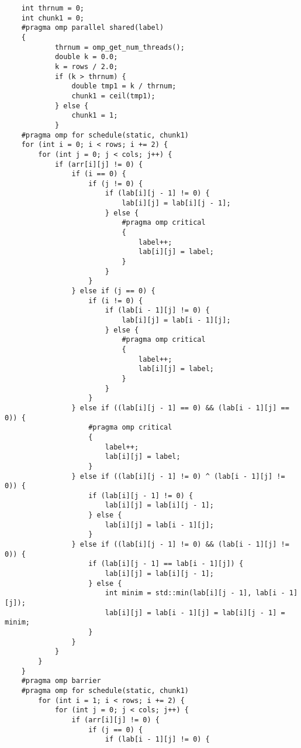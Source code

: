 \documentclass{report}
\begin{document}
\begin{lstlisting}
    int thrnum = 0;
    int chunk1 = 0;
    #pragma omp parallel shared(label)
    {
            thrnum = omp_get_num_threads();
            double k = 0.0;
            k = rows / 2.0;
            if (k > thrnum) {
                double tmp1 = k / thrnum;
                chunk1 = ceil(tmp1);
            } else {
                chunk1 = 1;
            }
    #pragma omp for schedule(static, chunk1)
    for (int i = 0; i < rows; i += 2) {
        for (int j = 0; j < cols; j++) {
            if (arr[i][j] != 0) {
                if (i == 0) {
                    if (j != 0) {
                        if (lab[i][j - 1] != 0) {
                            lab[i][j] = lab[i][j - 1];
                        } else {
                            #pragma omp critical
                            {
                                label++;
                                lab[i][j] = label;
                            }
                        }
                    }
                } else if (j == 0) {
                    if (i != 0) {
                        if (lab[i - 1][j] != 0) {
                            lab[i][j] = lab[i - 1][j];
                        } else {
                            #pragma omp critical
                            {
                                label++;
                                lab[i][j] = label;
                            }
                        }
                    }
                } else if ((lab[i][j - 1] == 0) && (lab[i - 1][j] == 0)) {
                    #pragma omp critical
                    {
                        label++;
                        lab[i][j] = label;
                    }
                } else if ((lab[i][j - 1] != 0) ^ (lab[i - 1][j] != 0)) {
                    if (lab[i][j - 1] != 0) {
                        lab[i][j] = lab[i][j - 1];
                    } else {
                        lab[i][j] = lab[i - 1][j];
                    }
                } else if ((lab[i][j - 1] != 0) && (lab[i - 1][j] != 0)) {
                    if (lab[i][j - 1] == lab[i - 1][j]) {
                        lab[i][j] = lab[i][j - 1];
                    } else {
                        int minim = std::min(lab[i][j - 1], lab[i - 1][j]);
                        lab[i][j] = lab[i - 1][j] = lab[i][j - 1] = minim;
                    }
                }
            }
        }
    }
    #pragma omp barrier
    #pragma omp for schedule(static, chunk1)
        for (int i = 1; i < rows; i += 2) {
            for (int j = 0; j < cols; j++) {
                if (arr[i][j] != 0) {
                    if (j == 0) {
                        if (lab[i - 1][j] != 0) {

\end{lstlisting}
\end{document}
